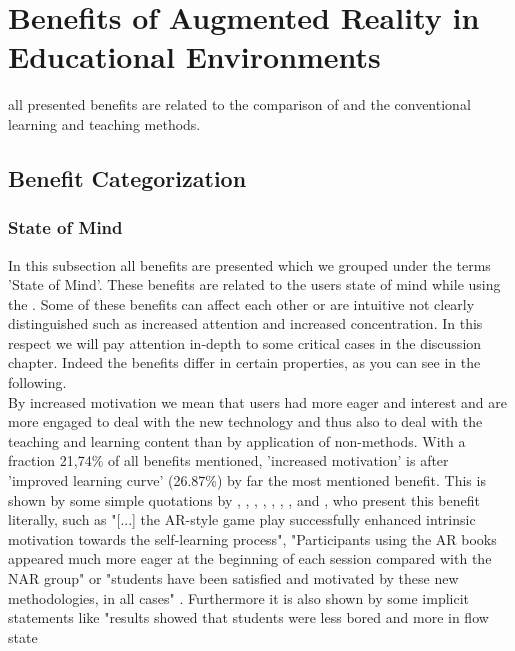 \section{Benefits of Augmented Reality in Educational Environments}
all presented benefits are related to the comparison of \AR \apps and the conventional learning and teaching methods.
\subsection{Benefit Categorization}
\label{subsec:Benefits}

% 
\subsubsection{State of Mind}
In this subsection all benefits are presented which we grouped under the terms 'State of Mind'. These benefits are related to the users state of mind while using the \AR \app. Some of these benefits can affect 
each other or are intuitive not clearly distinguished such as increased attention and increased concentration. In this respect we will pay attention in-depth to some critical cases in the discussion chapter. Indeed the benefits 
differ in certain properties, as you can see in the following. \\
By increased motivation we mean that users had more eager and interest and are more engaged to deal with the new technology and thus also to deal with the teaching and learning content than by application of non-\AR methods. With a fraction 21,74\% of all benefits mentioned, 
'increased motivation' is after 'improved learning curve' (26.87\%) by far the most mentioned benefit. This is shown by some simple quotations by \cite{Dunser.2012}, \cite{Iwata.2011}, 
\cite{Kamarainen.2013}, \cite{Liu.2009b}, \cite{MartinGutierrez.2011}, \cite{MartinGutierrez.2011}, \cite{Redondo.2013}, \cite{VateULan.2012} and \cite{Yen.2013}, who present this benefit literally, such as "[...] the AR-style game play successfully enhanced intrinsic motivation towards the self-learning process"\autocite[113]{Iwata.2011}, "Participants 
using the AR books appeared much more eager at the beginning of each session compared with the NAR group"\autocite[112]{Andreas.2012} or "students have been satisfied and motivated by these new methodologies, in all cases"
\autocite[et.al.][60]{Redondo.2013}. Furthermore it is also shown by some implicit statements like "results showed that students were less bored and more in flow state
